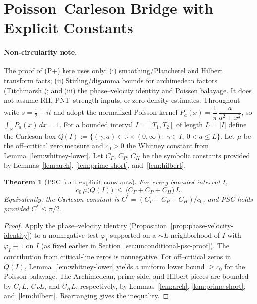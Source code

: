 \documentclass[11pt]{article}
\newtheorem{theorem}{Theorem}
\theoremstyle{definition}
\theoremstyle{remark}
\newcommand{\R}{\mathbb{R}}
\begin{document}
\section{Poisson--Carleson Bridge with Explicit Constants}\label{sec:pc-bridge}
\paragraph{Non-circularity note.}
The proof of (P+) here uses only: (i) smoothing/Plancherel and Hilbert transform facts; (ii) Stirling/digamma bounds for archimedean factors (Titchmarsh \cite[Ch.~IV]{TitchmarshZeta}); and (iii) the phase–velocity identity and Poisson balayage. It does not assume RH, PNT–strength inputs, or zero‑density estimates.
Throughout write $s=\tfrac12+it$ and adopt the normalized Poisson kernel $P_a(x)=\dfrac{1}{\pi}\,\dfrac{a}{a^2+x^2}$, so $\int_\R P_a(x)\,dx=1$. For a bounded interval $I=[T_1,T_2]$ of length $L=|I|$ define the Carleson box $Q(I):=\{(\gamma,a)\in\R\times(0,\infty):\ \gamma\in I,\ 0<a\le L\}$. Let $\mu$ be the off--critical zero measure and $c_0>0$ the Whitney constant from Lemma~\ref{lem:whitney-lower}. Let $C_\Gamma$, $C_P$, $C_H$ be the symbolic constants provided by Lemmas~\ref{lem:arch}, \ref{lem:prime-short}, and~\ref{lem:hilbert}.

\begin{theorem}[PSC from explicit constants]\label{thm:psc-constants}
For every bounded interval $I$,
\[ c_0\,\mu\big(Q(I)\big)\ \le\ \big(C_\Gamma + C_P + C_H\big)\,L. \]
Equivalently, the Carleson constant is $C^*=(C_\Gamma + C_P + C_H)/c_0$, and PSC holds provided $C^*\le \pi/2$.
\end{theorem}

\begin{proof}
Apply the phase--velocity identity (Proposition~\ref{prop:phase-velocity-identity}) to a nonnegative test $\varphi_I$ supported on a $\sim L$ neighborhood of $I$ with $\varphi_I\equiv 1$ on $I$ (as fixed earlier in Section~\ref{sec:unconditional-psc-proof}). The contribution from critical-line zeros is nonnegative. For off--critical zeros in $Q(I)$, Lemma~\ref{lem:whitney-lower} yields a uniform lower bound $\ge c_0$ for the Poisson balayage. The Archimedean, prime-side, and Hilbert pieces are bounded by $C_\Gamma L$, $C_P L$, and $C_H L$, respectively, by Lemmas~\ref{lem:arch}, \ref{lem:prime-short}, and~\ref{lem:hilbert}. Rearranging gives the inequality.
\end{proof}

\end{document}
